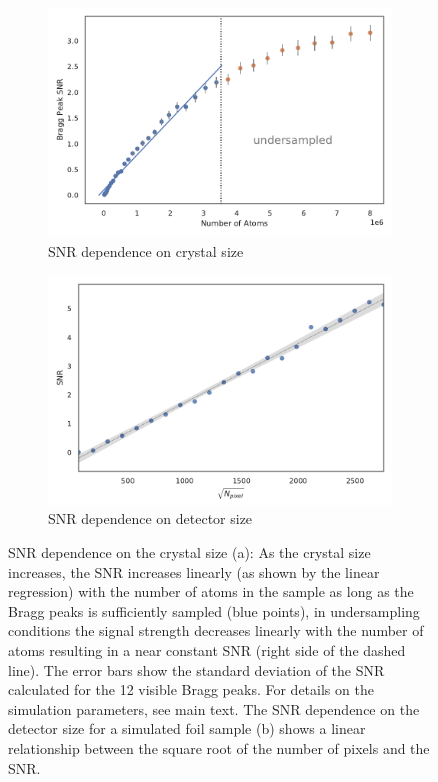 \begin{figure}
	\centering
	\begin{subfigure}[b]{0.48\textwidth}
		\includegraphics[width=\linewidth]{images/SNRNatoms.pdf}
		\caption{ SNR dependence on crystal size}
		\label{fig:SNRNatoms}
	\end{subfigure}
	\begin{subfigure}[b]{0.48\textwidth}
		\includegraphics[width=\linewidth]{images/detsize.pdf}
		\caption{SNR dependence on detector size}
		\label{fig:SNRdetsize}
	\end{subfigure}
	\caption[SNR dependence on crystal size and detector size]{SNR dependence on the crystal size (a): As the crystal size increases, the SNR increases linearly (as shown by the linear regression) with the number of atoms in the sample as long as the Bragg peaks is sufficiently sampled (blue points), in undersampling conditions the signal strength decreases linearly with the number of atoms resulting in a near constant SNR (right side of the dashed line). The error bars show the standard deviation of the SNR calculated for the 12 visible Bragg peaks. For details on the simulation parameters, see main text. The SNR dependence on the detector size for a simulated foil sample (b) shows a linear relationship between the square root of the number of pixels and the SNR.}
	
\end{figure}


